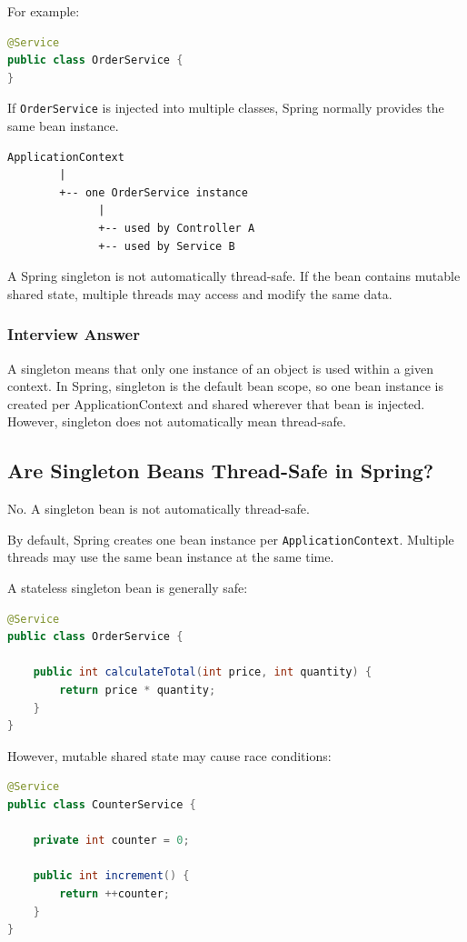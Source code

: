 \documentclass[12pt,a4paper]{article}
\begin{document}
For example:

\begin{lstlisting}[language=Java]
@Service
public class OrderService {
}
\end{lstlisting}

If \texttt{OrderService} is injected into multiple classes, Spring normally
provides the same bean instance.

\begin{verbatim}
ApplicationContext
        |
        +-- one OrderService instance
              |
              +-- used by Controller A
              +-- used by Service B
\end{verbatim}

A Spring singleton is not automatically thread-safe. If the bean contains
mutable shared state, multiple threads may access and modify the same data.

\subsubsection*{Interview Answer}

A singleton means that only one instance of an object is used within a
given context. In Spring, singleton is the default bean scope, so one bean
instance is created per ApplicationContext and shared wherever that bean is
injected. However, singleton does not automatically mean thread-safe.

\subsection{Are Singleton Beans Thread-Safe in Spring?}

No. A singleton bean is not automatically thread-safe.

By default, Spring creates one bean instance per
\texttt{ApplicationContext}. Multiple threads may use the same bean
instance at the same time.

A stateless singleton bean is generally safe:

\begin{lstlisting}[language=Java]
@Service
public class OrderService {

    public int calculateTotal(int price, int quantity) {
        return price * quantity;
    }
}
\end{lstlisting}

However, mutable shared state may cause race conditions:

\begin{lstlisting}[language=Java]
@Service
public class CounterService {

    private int counter = 0;

    public int increment() {
        return ++counter;
    }
}
\end{lstlisting}
\end{document}
